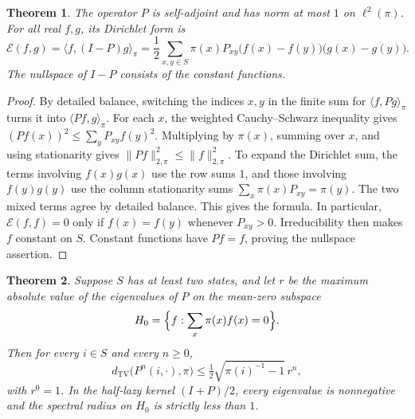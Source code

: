 \documentclass[11pt,oneside,openany]{book}
\theoremstyle{plain}
\newtheorem{theorem}{Theorem}[chapter]
\theoremstyle{definition}
\theoremstyle{remark}
\begin{document}
\begin{theorem}\label{p207:thm:reversible-form}
The operator \(P\) is self-adjoint and has norm at most \(1\) on
\(\ell^2(\pi)\). For all real \(f,g\), its Dirichlet form is
\[
 \mathcal E(f,g)=\langle f,(I-P)g\rangle_\pi
   =\frac12\sum_{x,y\in S}
       \pi(x)P_{xy}\bigl(f(x)-f(y)\bigr)\bigl(g(x)-g(y)\bigr).
\]
The nullspace of \(I-P\) consists of the constant functions.
\end{theorem}

\begin{proof}
By detailed balance, switching the indices \(x,y\) in the finite sum
for \(\langle f,Pg\rangle_\pi\) turns it into
\(\langle Pf,g\rangle_\pi\). For each \(x\), the weighted Cauchy--Schwarz
inequality gives \((Pf(x))^2\leq\sum_yP_{xy}f(y)^2\). Multiplying by
\(\pi(x)\), summing over \(x\), and using stationarity gives
\(\lVert Pf\rVert_{2,\pi}^2\leq \lVert f\rVert_{2,\pi}^2\).
To expand the Dirichlet sum, the terms involving \(f(x)g(x)\)
use the row sums \(1\), and those involving \(f(y)g(y)\)
use the column stationarity sums \(\sum_x\pi(x)P_{xy}=\pi(y)\).
The two mixed terms agree by detailed balance. This gives the
formula. In particular, \(\mathcal E(f,f)=0\) only if
\(f(x)=f(y)\) whenever \(P_{xy}>0\). Irreducibility then makes \(f\)
constant on \(S\). Constant functions have \(P f=f\), proving
the nullspace assertion.
\end{proof}

\begin{theorem}\label{p207:thm:spectral-tv}
Suppose \(S\) has at least two states, and let \(r\) be the maximum
absolute value of the eigenvalues of \(P\) on the mean-zero subspace
\[
 H_0=\Bigl\{f:\sum_x\pi(x)f(x)=0\Bigr\}.
\]
Then for every \(i\in S\) and every \(n\geq0\),
\[
 d_{\mathrm{TV}}\bigl(P^n(i,\cdot),\pi\bigr)
 \leq \tfrac12\sqrt{\pi(i)^{-1}-1}\,r^n ,
\]
with \(r^0=1\). In the half-lazy kernel \((I+P)/2\), every eigenvalue
is nonnegative and the spectral radius on \(H_0\) is strictly less
than \(1\).
\end{theorem}
\end{document}
